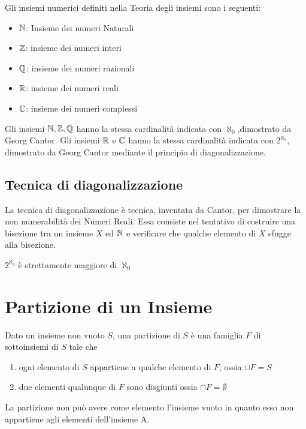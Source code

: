 Gli insiemi numerici definiti nella Teoria degli insiemi sono i seguenti:
\begin{itemize}
  \item $\mathbb{N}$: Insieme dei numeri Naturali
  \item $\mathbb{Z}$: insieme dei numeri interi
  \item $\mathbb{Q}$: insieme dei numeri razionali
  \item $\mathbb{R}$: insieme dei numeri reali
  \item $\mathbb{C}$: insieme dei numeri complessi
\end{itemize}
Gli insiemi $\mathbb{N}, \mathbb{Z}, \mathbb{Q}$ hanno la stessa cardinalità indicata con $\aleph_0$,dimostrato da Georg Cantor.\newline
Gli insiemi $\mathbb{R}$ e $\mathbb{C}$ hanno la stessa cardinalità indicata con $ 2 ^ {\aleph_0}$,
dimostrato da Georg Cantor mediante il principio di diagonalizzazione.

\subsection{Tecnica di diagonalizzazione}
La tecnica di diagonalizzazione è tecnica, inventata da Cantor, per dimostrare la
non numerabilità dei Numeri Reali.\newline
Essa consiste nel tentativo di costruire una bisezione tra un insieme $X$ ed $\mathbb{N}$
e verificare che qualche elemento di $X$ sfugge alla bisezione.

\begin{thm}
    $2^{\aleph_0}$ è strettamente maggiore di $\aleph_0$
\end{thm}






\section{Partizione di un Insieme}
Dato un insieme non vuoto $S$, una partizione di $S$ è una famiglia $F$ di sottoinsiemi di $S$ tale che
\begin{enumerate}
    \item ogni elemento di $S$ appartiene a qualche elemento di $F$, ossia $\cup F = S$
    \item due elementi qualunque di $F$ sono disgiunti ossia $\cap F = \emptyset$
\end{enumerate}
La partizione non può avere come elemento l'insieme vuoto in quanto esso non
appartiene agli elementi dell'insieme A.

